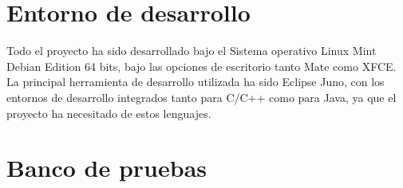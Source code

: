 \section{Entorno de desarrollo}
Todo el proyecto ha sido desarrollado bajo el Sistema operativo Linux Mint Debian Edition 64 bits, bajo las opciones de escritorio tanto Mate como XFCE.\\

La principal herramienta de desarrollo utilizada ha sido Eclipse Juno, con los entornos de desarrollo integrados tanto para C/C++ como para Java, ya que el proyecto ha necesitado de estos lenguajes.

\section{Banco de pruebas}
